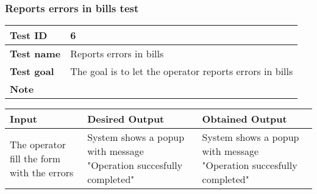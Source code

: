 {{		\subsubsection{Reports errors in bills test}{
			\begin{center}
			\begin{tabular}{|p{4cm}|p{10cm}|}
			\hline
				\centering \vspace{1mm} \bfseries{Test ID} \vspace{1mm} & 
				\vspace{1mm} 6 \vspace{1mm}\\
			\hline
				\centering \vspace{1mm} \bfseries{Test name} \vspace{1mm} & 
				\vspace{1mm} Reports errors in bills\vspace{1mm}\\
			\hline
				\centering \vspace{1mm} \bfseries{Test goal} \vspace{1mm} & 
				\vspace{1mm} The goal is to let the operator reports errors in bills\vspace{1mm}\\
			\hline
				\centering \vspace{1mm} \bfseries{Note} \vspace{1mm} & 
				\vspace{1mm}  \vspace{1mm}\\
			\hline
			\end{tabular}

			\begin{tabular}{|p{4cm}|p{5cm}|p{5cm}|}
			\hline
			\centering \vspace{1mm} \bfseries{Input} \vspace{1mm} & \vspace{1mm} \bfseries{Desired Output} \vspace{1mm} & \vspace{1mm} \bfseries{Obtained Output} \vspace{1mm}\\
			\hline
				\vspace{1mm} The operator fill the form with the errors \vspace{1mm} &
				\vspace{1mm} System shows a popup with message "Operation succesfully completed" \vspace{1mm} & 
				\vspace{1mm} System shows a popup with message "Operation succesfully completed" \vspace{1mm} \\
			\hline
			\end{tabular}
			\end{center}
		}
		\clearpage

}}

